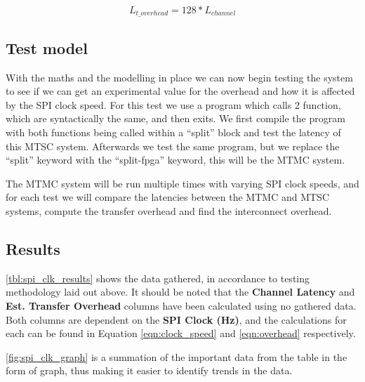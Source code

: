 \begin{equation}
    L_{t\_overhead} = 128 * L_{channel}
    \label{eqn:overhead}
\end{equation}

\subsection{Test model}

With the maths and the modelling in place we can now begin testing the system to see if we can get an experimental value for the overhead and how it is affected by the SPI clock speed. For this test we use a program which calls 2 function, which are syntactically the same, and then exits. We first compile the program with both functions being called within a “split” block and test the latency of this MTSC system. Afterwards we test the same program, but we replace the “split” keyword with the “split-fpga” keyword, this will be the MTMC system. 

The MTMC system will be run multiple times with varying SPI clock speeds, and for each test we will compare the latencies between the MTMC and MTSC systems, compute the transfer overhead and find the interconnect overhead.

\subsection{Results}

\autoref{tbl:spi_clk_results} shows the data gathered, in accordance to testing methodology laid out above. It should be noted that the \textbf{Channel Latency} and \textbf{Est. Transfer Overhead} columns have been calculated using no gathered data. Both columns are dependent on the \textbf{SPI Clock (Hz)}, and the calculations for each can be found in Equation \ref{eqn:clock_speed} and \ref{eqn:overhead} respectively.

\autoref{fig:spi_clk_graph} is a summation of the important data from the table in the form of graph, thus making it easier to identify trends in the data.

